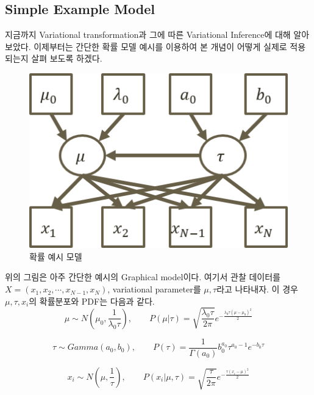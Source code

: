 \documentclass[draft=false]{oblivoir}
\begin{document}
\subsection{Simple Example Model}

지금까지 Variational transformation과 그에 따른 Variational Inference에 대해 알아 보았다. 이제부터는 간단한 확률 모델 예시를 이용하여 본 개념이 어떻게 실제로 적용되는지 살펴 보도록 하겠다. \\

\begin{figure}[ht] \centering 
\includegraphics[scale=0.6]{fig11_7.png} 
\caption{확률 예시 모델 }
\label{fig:11-7}
\end{figure}

위의 그림은 아주 간단한 예시의 Graphical model이다. 여기서 관찰 데이터를 $X = (x_{1}, x_{2}, \cdots, x_{N-1}, x_{N})$, variational parameter를 $\mu, \tau $라고 나타내자. 이 경우 $\mu, \tau, x_{i}$의 확률분포와 PDF는 다음과 같다.
\begin{equation}
\mu \sim N(\mu_{0},\frac{1}{\lambda_{0} \tau}), \qquad P(\mu|\tau) = \sqrt{ \frac{\lambda_{0} \tau}{ 2\pi}}e^{- \frac{ \lambda_{0} \tau(\mu-\mu_{0})^{2}}{2}}
\label{eq:11-2-15}
\end{equation}

\begin{equation}
\tau \sim Gamma(a_{0},b_{0}), \qquad P(\tau)= \frac{1}{\Gamma(a_{0})}b_{0}^{a_{0}}\tau^{a_{0}-1}e^{-b_{0}\tau}
\label{eq:11-2-2}
\end{equation}

\begin{equation}
x_{i} \sim N(\mu,\frac{1}{\tau}), \qquad P(x_{i}|\mu, \tau) = \sqrt{\frac{\tau}{2\pi}}e^{- \frac{\tau(x_{i}-\mu)^{2}}{2}}
\label{eq:11-2-3}
\end{equation}
\end{document}
